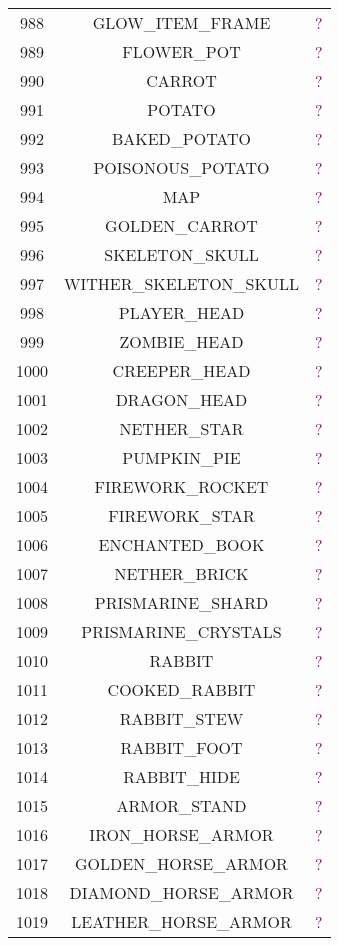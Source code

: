 \documentclass[11pt]{article}
\newcommand\myworries[1]{\textcolor{purple}{#1}}
\begin{document}
\begin{longtable}{ |c|c|c| }
	988 & GLOW\_ITEM\_FRAME & \myworries{?} \\
	989 & FLOWER\_POT & \myworries{?} \\
	990 & CARROT & \myworries{?} \\
	991 & POTATO & \myworries{?} \\
	992 & BAKED\_POTATO & \myworries{?} \\
	993 & POISONOUS\_POTATO & \myworries{?} \\
	994 & MAP & \myworries{?} \\
	995 & GOLDEN\_CARROT & \myworries{?} \\
	996 & SKELETON\_SKULL & \myworries{?} \\
	997 & WITHER\_SKELETON\_SKULL & \myworries{?} \\
	998 & PLAYER\_HEAD & \myworries{?} \\
	999 & ZOMBIE\_HEAD & \myworries{?} \\
	1000 & CREEPER\_HEAD & \myworries{?} \\
	1001 & DRAGON\_HEAD & \myworries{?} \\
	1002 & NETHER\_STAR & \myworries{?} \\
	1003 & PUMPKIN\_PIE & \myworries{?} \\
	1004 & FIREWORK\_ROCKET & \myworries{?} \\
	1005 & FIREWORK\_STAR & \myworries{?} \\
	1006 & ENCHANTED\_BOOK & \myworries{?} \\
	1007 & NETHER\_BRICK & \myworries{?} \\
	1008 & PRISMARINE\_SHARD & \myworries{?} \\
	1009 & PRISMARINE\_CRYSTALS & \myworries{?} \\
	1010 & RABBIT & \myworries{?} \\
	1011 & COOKED\_RABBIT & \myworries{?} \\
	1012 & RABBIT\_STEW & \myworries{?} \\
	1013 & RABBIT\_FOOT & \myworries{?} \\
	1014 & RABBIT\_HIDE & \myworries{?} \\
	1015 & ARMOR\_STAND & \myworries{?} \\
	1016 & IRON\_HORSE\_ARMOR & \myworries{?} \\
	1017 & GOLDEN\_HORSE\_ARMOR & \myworries{?} \\
	1018 & DIAMOND\_HORSE\_ARMOR & \myworries{?} \\
	1019 & LEATHER\_HORSE\_ARMOR & \myworries{?} \\

\end{longtable}
\end{document}
